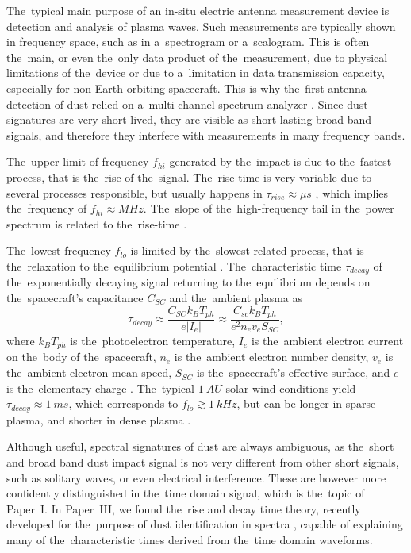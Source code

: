 The~typical main purpose of an in-situ electric antenna measurement device is detection and analysis of plasma waves. Such measurements are typically shown in frequency space, such as in a~spectrogram or a~scalogram. This is often the~main, or even the~only data product of the~measurement, due to physical limitations of the~device or due to a~limitation in data transmission capacity, especially for non-Earth orbiting spacecraft. This is why the~first antenna detection of dust relied on a~multi-channel spectrum analyzer \citep{scarf1982voyager}. Since dust signatures are very short-lived, they are visible as short-lasting broad-band signals, and therefore they interfere with measurements in many frequency bands. 

The~upper limit of frequency $f_{hi}$ generated by the~impact is due to the~fastest process, that is the~rise of the~signal. The~rise-time is very variable due to several processes responsible, but usually happens in $\tau_{rise} \approx \si{\mu s}$ \citep{meyer2017frequency,shen2023variability}, which implies the~frequency of $f_{hi} \approx \si{M Hz}$. The~slope of the~high-frequency tail in the~power spectrum is related to the~rise-time \citep{meyer2017frequency}. 

The~lowest frequency $f_{lo}$ is limited by the~slowest related process, that is the~relaxation to the~equilibrium potential \citep{zaslavsky2015floating}. The~characteristic time $\tau_{decay}$ of the~exponentially decaying signal returning to the~equilibrium depends on the~spacecraft's capacitance $C_{SC}$ and the~ambient plasma as 
\begin{equation}    
\tau_{decay} \approx \frac{C_{SC} k_B T_{ph}}{e|I_{e}|} \approx \frac{C_{sc} k_B T_{ph}}{e^2 n_e v_e S_{SC}}, 
\end{equation}
where $k_B T_{ph}$ is the~photoelectron temperature, $I_e$ is the~ambient electron current on the~body of the~spacecraft, $n_e$ is the~ambient electron number density, $v_e$ is the~ambient electron mean speed, $S_{SC}$ is the~spacecraft's effective surface, and $e$ is the~elementary charge \citep{henri2011observations}. The~typical $\SI{1}{AU}$ solar wind conditions yield $\tau_{decay} \approx \SI{1}{m s}$, which corresponds to $f_{lo} \gtrsim \SI{1}{kHz}$, but can be longer in sparse plasma, and shorter in dense plasma \citep{zaslavsky2015floating,vaverka2017detection,meyer2017frequency}. 

Although useful, spectral signatures of dust are always ambiguous, as the~short and broad band dust impact signal is not very different from other short signals, such as solitary waves, or even electrical interference. These are however more confidently distinguished in the~time domain signal, which is the~topic of Paper~I. In Paper~III, we found the~rise and decay time theory, recently developed for the~purpose of dust identification in spectra \citep{meyer2017frequency}, capable of explaining many of the~characteristic times derived from the~time domain waveforms.

